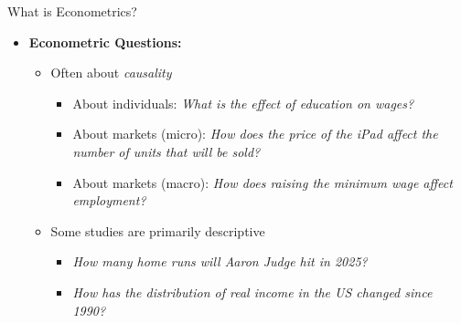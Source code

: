\begin{frame}{What is Econometrics?}
\begin{itemize}
	\item {\bf Econometric Questions:}
	\begin{itemize}
			\item Often about \emph{causality}
			\begin{itemize}
				\item About individuals: \emph{What is the effect of education on wages?}
				\item About markets (micro):   \emph{How does the price of the iPad affect the number of units that will be sold?}
				\item About markets (macro): \emph{How does raising the minimum wage affect employment?}
			\end{itemize}
			
			\bigskip
			\item Some studies are primarily descriptive 
			\begin{itemize}
				\item \emph{How many home runs will Aaron Judge hit in 2025?}
				\item \emph{How has the distribution of real income in the US changed since 1990?}
			\end{itemize}

	\end{itemize}				

\end{itemize}
\end{frame}

